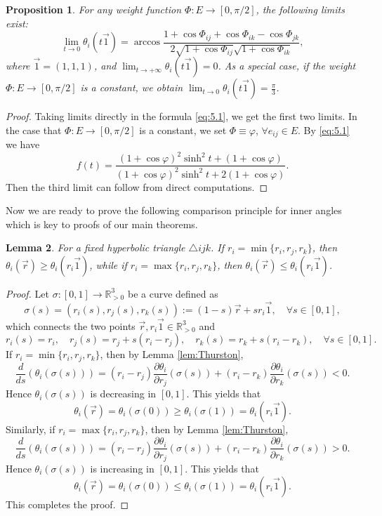 \documentclass[12pt]{amsart}
\numberwithin{equation}{section}
\newtheorem{prop}{Proposition}[section]
\newtheorem{lem}[prop]{Lemma}
\begin{document}
\begin{prop}\label{prop:5.4}
For any weight function $\Phi: E \to [0,\pi/2]$, the following limits exist:
\[
\lim_{t \to 0} \theta_i(t\vec{1}) = \arccos \frac{1 + \cos\Phi_{ij} + \cos\Phi_{ik} - \cos\Phi_{jk}}{2\sqrt{1 + \cos\Phi_{ij}}\sqrt{1 + \cos\Phi_{ik}}},
\]
where $\vec{1} = (1,1,1)$, and $\lim_{t \to +\infty} \theta_i(t\vec{1}) = 0$. As a special case, if the weight $\Phi: E \to [0,\pi/2]$ is a constant,
we obtain $\lim_{t \to 0} \theta_i(t\vec{1}) = \frac{\pi}{3}$.
\end{prop}

\begin{proof}
Taking limits directly in the formula \eqref{eq:5.1}, we get the first two limits. In the case that $\Phi: E \to
[0,\pi/2]$ is a constant, we set $\Phi \equiv \varphi$, $\forall e_{ij} \in E$. By \eqref{eq:5.1} we have
\[
f(t) = \frac{(1 + \cos\varphi)^2\sinh^2 t + (1 + \cos\varphi)}{(1 + \cos\varphi)^2\sinh^2 t + 2(1 + \cos\varphi)}.
\]
Then the third limit can follow from direct computations.
\end{proof}

Now we are ready to prove the following comparison principle for inner angles which is key to proofs
of our main theorems.

\begin{lem}\label{lem:5.6}
For a fixed hyperbolic triangle $\triangle ijk$. If $r_i = \min\{r_i, r_j, r_k\}$, then $\theta_i(\vec{r}) \geq \theta_i(r_i\vec{1})$, while if
$r_i = \max\{r_i, r_j, r_k\}$, then $\theta_i(\vec{r}) \leq \theta_i(r_i\vec{1})$.
\end{lem}

\begin{proof}
Let $\sigma: [0,1] \to \mathbb{R}^3_{>0}$ be a curve defined as
\[
\sigma(s) = (r_i(s), r_j(s), r_k(s)) := (1-s)\vec{r} + s r_i \vec{1}, \quad \forall s \in [0,1],
\]
which connects the two points $\vec{r}, r_i\vec{1} \in \mathbb{R}^3_{>0}$ and
\[
r_i(s) = r_i, \quad r_j(s) = r_j + s(r_i - r_j), \quad r_k(s) = r_k + s(r_i - r_k), \quad \forall s \in [0,1].
\]
If $r_i = \min\{r_i, r_j, r_k\}$, then by Lemma \ref{lem:Thurston},
\begin{equation}\label{eq:5.3}
\frac{d}{ds}(\theta_i(\sigma(s))) = (r_i - r_j)\frac{\partial\theta_i}{\partial r_j}(\sigma(s)) + (r_i - r_k)\frac{\partial\theta_i}{\partial r_k}(\sigma(s)) < 0.
\end{equation}
Hence $\theta_i(\sigma(s))$ is decreasing in $[0,1]$. This yields that
\[
\theta_i(\vec{r}) = \theta_i(\sigma(0)) \geq \theta_i(\sigma(1)) = \theta_i(r_i\vec{1}).
\]
Similarly, if $r_i = \max\{r_i, r_j, r_k\}$, then by Lemma \ref{lem:Thurston},
\begin{equation}\label{eq:5.4}
\frac{d}{ds}(\theta_i(\sigma(s))) = (r_i - r_j)\frac{\partial\theta_i}{\partial r_j}(\sigma(s)) + (r_i - r_k)\frac{\partial\theta_i}{\partial r_k}(\sigma(s)) > 0.
\end{equation}
Hence $\theta_i(\sigma(s))$ is increasing in $[0,1]$. This yields that
\[
\theta_i(\vec{r}) = \theta_i(\sigma(0)) \leq \theta_i(\sigma(1)) = \theta_i(r_i\vec{1}).
\]
This completes the proof.
\end{proof}
\end{document}
